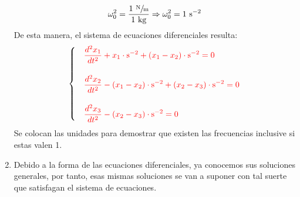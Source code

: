 \begin{multicols}{2}
\begin{enumerate}[leftmargin=15pt]
    \begin{align*}
        \omega^{2}_{0} = \frac{1~\sfrac{\mathrm{N}}{\mathrm{m}}}{1~\mathrm{kg}} \Rightarrow \omega^{2}_{0} = 1~\mathrm{s}^{-2}
    \end{align*}
    De esta manera, el sistema de ecuaciones diferenciales resulta:
    \begin{equation*}
        \begin{cases}
            &\textcolor{rojo}{\displaystyle\frac{d^{2}x_{1}}{dt^{2}} + x_{1} \cdot \mathrm{s}^{-2} + (x_1 - x_2) \cdot \mathrm{s}^{-2} = 0}\\
            \\
            &\textcolor{rojo}{\displaystyle\frac{d^{2}x_{2}}{dt^{2}} - (x_1 - x_2) \cdot \mathrm{s}^{-2} + (x_2 - x_3) \cdot \mathrm{s}^{-2} = 0}\\
            \\
            &\textcolor{rojo}{\displaystyle\frac{d^{2}x_{3}}{dt^{2}} - (x_2 - x_3) \cdot \mathrm{s}^{-2} = 0}
        \end{cases}
    \end{equation*}
    Se colocan las unidades para demostrar que existen las frecuencias inclusive si estas valen 1.
    \item Debido a la forma de las ecuaciones diferenciales, ya conocemos sus soluciones generales, por tanto, esas mismas soluciones se van a suponer con tal suerte que satisfagan el sistema de ecuaciones.
    

\end{enumerate}
\end{multicols}
